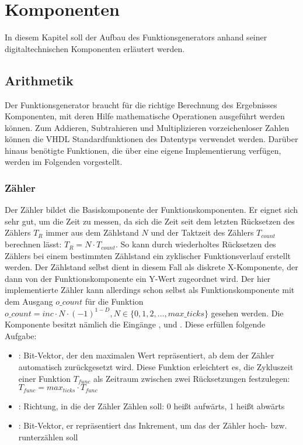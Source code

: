 \chapter{Komponenten}
In diesem Kapitel soll der Aufbau des Funktionsgenerators anhand seiner
digitaltechnischen Komponenten erläutert werden.

\section{Arithmetik}
Der Funktionsgenerator braucht für die richtige Berechnung des Ergebnisses Komponenten, mit deren Hilfe mathematische Operationen ausgeführt werden können.
Zum Addieren, Subtrahieren und Multiplizieren vorzeichenloser Zahlen können die VHDL Standardfunktionen des Datentyps  verwendet werden.
Darüber hinaus benötigte Funktionen, die über eine eigene Implementierung verfügen, werden im Folgenden vorgestellt.

\subsection{Zähler} \label{Comp:Arith:Count}
Der Zähler bildet die Basiskomponente der Funktionskomponenten. Er eignet sich sehr gut, um die Zeit zu messen, da sich die Zeit seit dem letzten Rücksetzen des Zählers $T_{R}$ immer aus dem Zählstand $N$ und der Taktzeit des Zählers $T_{count}$ berechnen lässt: $T_{R} = N \cdot T_{count}$. So kann durch wiederholtes Rücksetzen des Zählers bei einem bestimmten Zählstand ein zyklischer Funktionsverlauf erstellt werden.
Der Zählstand selbst dient in diesem Fall als diskrete X-Komponente, der dann von der Funktionskomponente ein Y-Wert zugeordnet wird.
Der hier implementierte Zähler kann allerdings schon selbst als Funktionskomponente mit dem Ausgang $o\_count$ für die Funktion $o\_count = inc \cdot N \cdot (-1) ^ {1 - D}, N \in \{0, 1, 2, \dots, max\_ticks\}$ gesehen werden.
Die Komponente besitzt nämlich die Eingänge ,  und . Diese erfüllen folgende Aufgabe:
\begin{itemize}
\item {}: Bit-Vektor, der den maximalen Wert repräsentiert, ab dem der Zähler automatisch zurückgesetzt wird.
Diese Funktion erleichtert es, die Zykluszeit einer Funktion $T_{func}$ als Zeitraum zwischen zwei Rücksetzungen festzulegen: $T_{func} = max_{ticks} \cdot T_{func}$
\item {}: Richtung, in die der Zähler Zählen soll: 0 heißt aufwärts, 1 heißt abwärts
  \item {}: Bit-Vektor, er repräsentiert das Inkrement, um das der Zähler hoch- bzw. runterzählen soll
\end{itemize}

